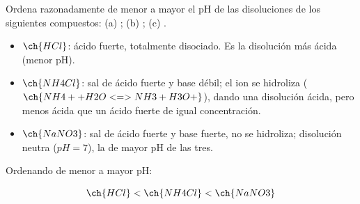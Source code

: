 \begin{exerciseEVAU}
    Ordena razonadamente de menor a mayor el pH de las disoluciones  de los siguientes compuestos: (a) ; (b) ; (c) .



    \begin{solu}


        \begin{itemize}
            \item \(\ch{HCl}\): ácido fuerte, totalmente disociado. Es la disolución más ácida (menor pH).
            \item \(\ch{NH4Cl}\): sal de ácido fuerte y base débil; el ion  se hidroliza (\(\ch{NH4+ + H2O <=> NH3 + H3O+}\)), dando una disolución ácida, pero menos ácida que un ácido fuerte de igual concentración.
            \item \(\ch{NaNO3}\): sal de ácido fuerte y base fuerte, no se hidroliza; disolución neutra (\(pH = 7\)), la de mayor pH de las tres.
        \end{itemize}

        Ordenando de menor a mayor pH:

        \begin{equation*}
            \ch{HCl} < \ch{NH4Cl} < \ch{NaNO3}
        \end{equation*}

    \end{solu}
\end{exerciseEVAU}
